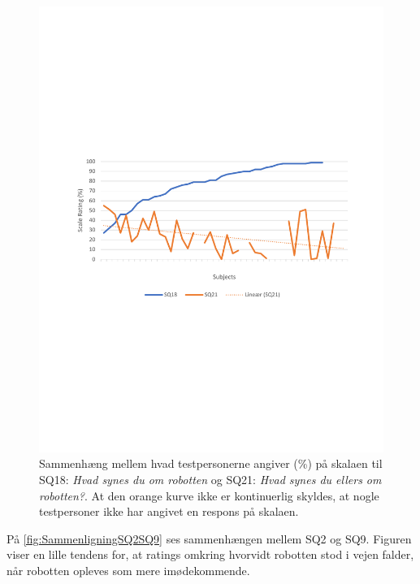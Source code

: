 \begin{figure}[H]
	\centering
	\includegraphics[width=\textwidth]{Figure/Korrelationsgrafer/SQ18+SQ21}
	\caption{Sammenhæng mellem hvad testpersonerne angiver (\%) på skalaen til SQ18: \textit{Hvad synes du om robotten} og SQ21: \textit{Hvad synes du ellers om robotten?}. At den orange kurve ikke er kontinuerlig skyldes, at nogle testpersoner ikke har angivet en respons på skalaen.}
	\label{fig:SammenligningSQ18SQ21}
\end{figure}
\noindent
%
På \autoref{fig:SammenligningSQ2SQ9} ses sammenhængen mellem SQ2 og SQ9. Figuren viser en lille tendens for, at ratings omkring hvorvidt robotten stod i vejen falder, når robotten opleves som mere imødekommende.
%
